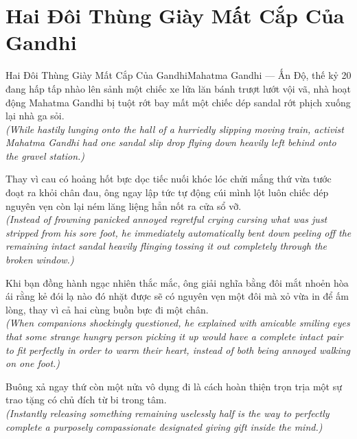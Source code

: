 \section{Hai Đôi Thùng Giày Mất Cắp Của Gandhi}
\begin{truyen}{Hai Đôi Thùng Giày Mất Cắp Của Gandhi}{Mahatma Gandhi --- Ấn Độ, thế kỷ 20}
 đang hấp tấp nhào lên sảnh một chiếc xe lửa lăn bánh trượt lướt vội vã, nhà hoạt động Mahatma Gandhi bị tuột rớt bay mất một chiếc dép sandal rớt phịch xuống lại nhà ga sỏi.\\[4pt]
\textit{(While hastily lunging onto the hall of a hurriedly slipping moving train, activist Mahatma Gandhi had one sandal slip drop flying down heavily left behind onto the gravel station.)}

Thay vì cau có hoảng hốt bực dọc tiếc nuối khóc lóc chửi mắng thứ vừa tước đoạt ra khỏi chân đau, ông ngay lập tức tự động cúi mình lột luôn chiếc dép nguyên vẹn còn lại ném lăng liệng hẳn nốt ra cửa sổ vỡ.\\[4pt]
\textit{(Instead of frowning panicked annoyed regretful crying cursing what was just stripped from his sore foot, he immediately automatically bent down peeling off the remaining intact sandal heavily flinging tossing it out completely through the broken window.)}

Khi bạn đồng hành ngạc nhiên thắc mắc, ông giải nghĩa bằng đôi mắt nhoẻn hòa ái rằng kẻ đói lạ nào đó nhặt được sẽ có nguyên vẹn một đôi mà xỏ vừa in để ấm lòng, thay vì cả hai cùng buồn bực đi một chân.\\[4pt]
\textit{(When companions shockingly questioned, he explained with amicable smiling eyes that some strange hungry person picking it up would have a complete intact pair to fit perfectly in order to warm their heart, instead of both being annoyed walking on one foot.)}

\end{truyen}
\begin{baihoc}
  Buông xả ngay thứ còn một nửa vô dụng đi là cách hoàn thiện trọn trịa một sự trao tặng có chủ đích từ bi trong tâm.\\[4pt]
  \textit{(Instantly releasing something remaining uselessly half is the way to perfectly complete a purposely compassionate designated giving gift inside the mind.)}
\end{baihoc}

